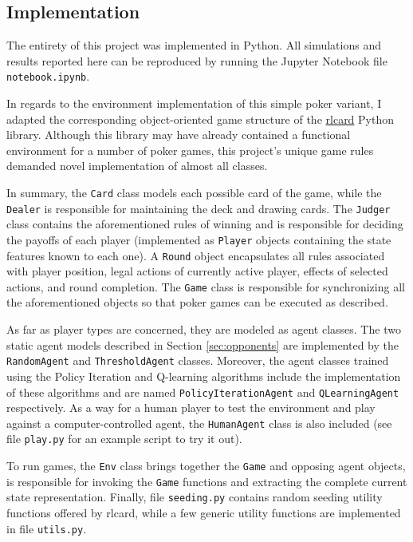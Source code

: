 \subsection{Implementation}

The entirety of this project was implemented in Python. All simulations and results reported here can be reproduced by running the Jupyter Notebook file \Verb|notebook.ipynb|.

In regards to the environment implementation of this simple poker variant, I adapted the corresponding object-oriented game structure of the \href{https://rlcard.org/}{rlcard} Python library. Although this library may have already contained a functional environment for a number of poker games, this project's unique game rules demanded novel implementation of almost all classes.

In summary, the \Verb|Card| class models each possible card of the game, while the \Verb|Dealer| is responsible for maintaining the deck and drawing cards. The \Verb|Judger| class contains the aforementioned rules of winning and is responsible for deciding the payoffs of each player (implemented as \Verb|Player| objects containing the state features known to each one). A \Verb|Round| object encapsulates all rules associated with player position, legal actions of currently active player, effects of selected actions, and round completion. The \Verb|Game| class is responsible for synchronizing all the aforementioned objects so that poker games can be executed as described.

As far as player types are concerned, they are modeled as agent classes. The two static agent models described in Section \ref{sec:opponents} are implemented by the \Verb|RandomAgent| and \Verb|ThresholdAgent| classes. Moreover, the agent classes trained using the Policy Iteration and Q-learning algorithms include the implementation of these algorithms and are named \Verb|PolicyIterationAgent| and \Verb|QLearningAgent| respectively. As a way for a human player to test the environment and play against a computer-controlled agent, the \Verb|HumanAgent| class is also included (see file \Verb|play.py| for an example script to try it out).

To run games, the \Verb|Env| class brings together the \Verb|Game| and opposing agent objects, is responsible for invoking the \Verb|Game| functions and extracting the complete current state representation. Finally, file \Verb|seeding.py| contains random seeding utility functions offered by rlcard, while a few generic utility functions are implemented in file \Verb|utils.py|.

